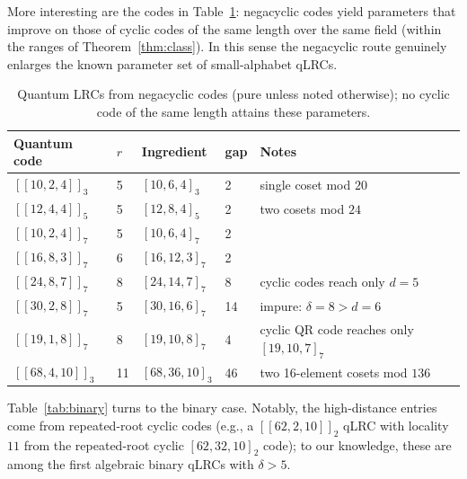 \documentclass[journal,onecolumn]{IEEEtran}
\newcommand{\dsb}[1]{[\![#1]\!]}
\begin{document}
More interesting are the codes in Table~\ref{tab:negacyclic}: negacyclic codes yield parameters that improve on those of cyclic codes of the same length over the same field (within the ranges of Theorem~\ref{thm:class}). In this sense the negacyclic route genuinely enlarges the known parameter set of small-alphabet qLRCs.

\begin{table}[!htbp]
\caption{Quantum LRCs from negacyclic codes (pure unless noted otherwise); no cyclic code of the same length attains these parameters.}
\label{tab:negacyclic}
\centering
\renewcommand{\arraystretch}{1.15}
\begin{tabular}{lllll}
\toprule
Quantum code & $r$ & Ingredient & gap & Notes \\
\midrule
$[[10,2,4]]_3$  & 5  & $[10,6,4]_3$  & 2 & single coset mod $20$ \\
$[[12,4,4]]_5$  & 5  & $[12,8,4]_5$  & 2 & two cosets mod $24$ \\
$[[10,2,4]]_7$  & 5  & $[10,6,4]_7$  & 2 & \\
$[[16,8,3]]_7$  & 6  & $[16,12,3]_7$ & 2 & \\
$[[24,8,7]]_7$  & 8  & $[24,14,7]_7$ & 8 & cyclic codes reach only $d=5$ \\
$[[30,2,8]]_7$  & 5  & $[30,16,6]_7$ & 14 & impure: $\delta=8>d=6$ \\
$[[19,1,8]]_7$  & 8  & $[19,10,8]_7$ & 4 & cyclic QR code reaches only $[19,10,7]_7$ \\
$[[68,4,10]]_3$ & 11 & $[68,36,10]_3$ & 46 & two 16-element cosets mod $136$ \\
\bottomrule
\end{tabular}
\end{table}

Table~\ref{tab:binary} turns to the binary case. Notably, the high-distance entries come from repeated-root cyclic codes (e.g., a $\dsb{62,2,10}_2$ qLRC with locality $11$ from the repeated-root cyclic $[62,32,10]_2$ code); to our knowledge, these are among the first algebraic binary qLRCs with $\delta>5$.
\end{document}
